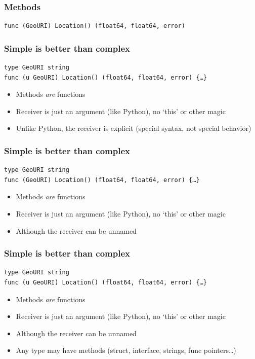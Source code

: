 \documentclass[xelatex,aspectratio=169]{beamer}
\begin{document}
{
\renewcommand{\fcolorbox}[4][]{#4}
\begin{frame}[fragile]
	\frametitle{Methods}
\begin{verbatim}
func (GeoURI) Location() (float64, float64, error)
\end{verbatim}
\end{frame}

\begin{frame}[fragile]
	\frametitle{Simple is better than complex}
\begin{verbatim}
type GeoURI string
func (u GeoURI) Location() (float64, float64, error) {…}
\end{verbatim}
\begin{itemize}[<+(1)->]
	\item Methods \emph{are} functions
	\item Receiver is just an argument (like Python), no `this' or other magic
	\item Unlike Python, the receiver is explicit (special syntax, not special behavior)
\end{itemize}
\end{frame}
\begin{frame}[fragile]
	\frametitle{Simple is better than complex}
\begin{verbatim}
type GeoURI string
func (GeoURI) Location() (float64, float64, error) {…}
\end{verbatim}
\begin{itemize}
	\item Methods \emph{are} functions
	\item Receiver is just an argument (like Python), no `this' or other magic
	\item Although the receiver can be unnamed
\end{itemize}
\end{frame}
\begin{frame}[fragile]
	\frametitle{Simple is better than complex}
\begin{verbatim}
type GeoURI string
func (u GeoURI) Location() (float64, float64, error) {…}
\end{verbatim}
\begin{itemize}
	\item Methods \emph{are} functions
	\item Receiver is just an argument (like Python), no `this' or other magic
	\item Although the receiver can be unnamed
	\item Any type may have methods (struct, interface, strings, func pointers\ldots)
\end{itemize}
\end{frame}

}
\end{document}
